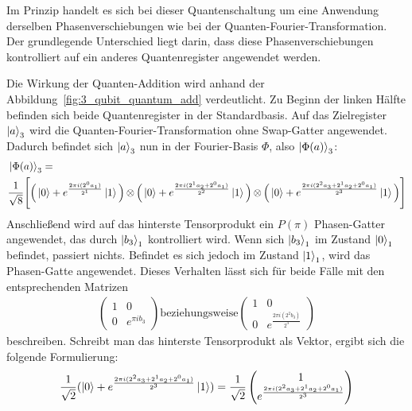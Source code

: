 Im Prinzip handelt es sich bei dieser Quantenschaltung um eine Anwendung derselben Phasenverschiebungen 
wie bei der Quanten-Fourier-Transformation. 
Der grundlegende Unterschied liegt darin, 
dass diese Phasenverschiebungen kontrolliert auf ein anderes Quantenregister angewendet werden.

Die Wirkung der Quanten-Addition wird anhand der Abbildung~\ref{fig:3_qubit_quantum_add} verdeutlicht.
Zu Beginn der linken Hälfte befinden sich beide Quantenregister in der Standardbasis.
Auf das Zielregister \(\ket{a}_3\) wird die Quanten-Fourier-Transformation ohne Swap-Gatter angewendet.
Dadurch befindet sich \(\ket{a}_3\) nun in der Fourier-Basis \(\Phi\), also \(\ket{\Phi(a)}_3\):
\begin{align*}
  \begin{aligned}
  &\ket{\Phi(a)}_3 =\\
  &\frac{1}{\sqrt{8}} \Bigg[ \Big(\ket{0} + { e^{\frac{2 \pi i (2^0a_1)}{2^1}}}\ket{1} \Big) \operatorname{\otimes}
  \Big(\ket{0} + { e^{\frac{2 \pi i (2^1a_2+2^0a_1)}{2^2}}}\ket{1} \Big) \operatorname{\otimes}
  \Big(\ket{0} + { e^{\frac{2 \pi i (2^{2}a_3 +2^1a_2+2^0a_1)}{2^3}}}\ket{1} \Big) \Bigg]
  \end{aligned}
\end{align*}
Anschließend wird auf das hinterste Tensorprodukt ein \(P(\pi)\) Phasen-Gatter angewendet,
das durch \(\ket{b_3}_1\) kontrolliert wird.
Wenn sich \(\ket{b_3}_1\) im Zustand \(\ket{0}_1\) befindet, passiert nichts.
Befindet es sich jedoch im Zustand \(\ket{1}_1\), wird das Phasen-Gatte angewendet.
Dieses Verhalten lässt sich für beide Fälle mit den entsprechenden Matrizen
\begin{align*}
  \begin{pmatrix}
    1 & 0 \\
    0 & e^{\pi i b_3}
  \end{pmatrix}  
  \text{beziehungsweise}  
  \begin{pmatrix}
    1 & 0 \\
    0 & e^{\frac{2\pi i (2^2b_3)}{2^3}}
  \end{pmatrix}
\end{align*}
beschreiben.
Schreibt man das hinterste Tensorprodukt als Vektor, ergibt sich die folgende Formulierung:
\[\frac{1}{\sqrt{2}}( \ket{0} + { e^{\frac{2 \pi i (2^{2}a_3 +2^1a_2+2^0a_1)}{2^3}}}\ket{1}) =
\frac{1}{\sqrt{2}}
\begin{pmatrix}
     1  \\
     e^{\frac{2 \pi i (2^{2}a_3 +2^1a_2+2^0a_1)}{2^3}}
  \end{pmatrix}
    \]
